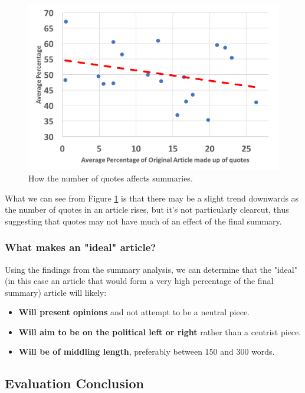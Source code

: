 \documentclass[12pt]{article}
\begin{document}
\begin{figure}[ht!]
  \centering
    \includegraphics[scale=0.6]{quotes.png}
   \caption[A graph depicting responses to the User Interface Survey]{How the number of quotes affects summaries.}
   \label{quotes}
\end{figure}

What we can see from Figure \ref{quotes} is that there may be a slight trend downwards as the number of quotes in an article rises, but it's not particularly clearcut, thus suggesting that quotes may not have much of an effect of the final summary. 

\subsubsection{What makes an "ideal" article?}

Using the findings from the summary analysis, we can determine that the "ideal" (in this case an article that would form a very high percentage of the final summary) article will likely:

\begin{itemize}
	\item \textbf{Will present opinions} and not attempt to be a neutral piece. 
	\item \textbf{Will aim to be on the political left or right} rather than a centrist piece.
	\item \textbf{Will be of middling length}, preferably between 150 and 300 words.
\end{itemize}

\subsection{Evaluation Conclusion}
\end{document}
